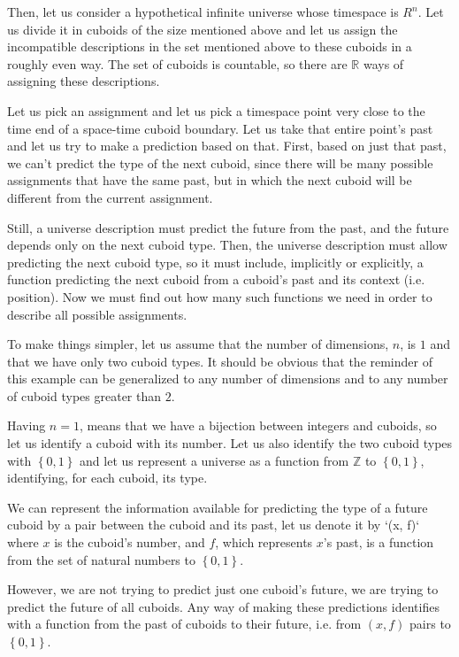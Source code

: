 \documentclass[a4paper
,draft
]{article}
\def\reale{\mathbb{R}}
\def\intregi{\mathbb{Z}}
\newcommand{\multime}[1]{\left\{ #1 \right\}}
\begin{document}
Then, let us consider a hypothetical infinite universe whose timespace is $R^n$.
Let us divide it in cuboids of the size mentioned above
and let us assign the incompatible
descriptions in the set mentioned above to these cuboids in a roughly even
way.
The set of cuboids is countable, so there are $\reale$ ways of
assigning these descriptions.

Let us pick an assignment and let us pick a timespace point very close to the
time end of a space-time cuboid boundary.
Let us take that entire point's past and let us try to make a prediction based
on that.
First, based on just that past, we can't predict the type of the next cuboid,
since there will be many possible assignments that have the same past, but in
which the next cuboid will be different from the current assignment.

Still, a universe description must predict the future from the past, and
the future depends only on the next cuboid type. Then, the universe
description must allow predicting the next cuboid type, so it must include,
implicitly or explicitly,
a function predicting the next cuboid from a cuboid's past
and its context (i.e. position). Now we must find out how many such functions
we need in order to describe all possible assignments.

To make things simpler, let us assume that the number of dimensions, $n$,
is $1$ and that we have only two cuboid types.
It should be obvious that
the reminder of this example can be generalized to any number of dimensions
and to any number of cuboid types greater than $2$.

Having $n=1$, means that we have a bijection between integers and cuboids,
so let us identify a cuboid with its number.
Let us also identify the two cuboid types with $\multime{0, 1}$ and
let us represent a universe as a function from $\intregi$ to $\multime{0, 1}$,
identifying, for each cuboid, its type.

We can represent the information available for predicting the type of a future
cuboid by a pair between the cuboid and its past, let us denote it
by `(x, f)` where $x$ is the cuboid's number, and $f$, which represents
$x$'s past, is a function from the set of natural numbers to $\multime{0,1}$.

However, we are not trying to predict just one cuboid's future,
we are trying to predict the future of all cuboids.
Any way of making these predictions identifies with a function from the past
of cuboids to their future, i.e. from $(x, f)$ pairs to $\multime{0, 1}$.
\end{document}
